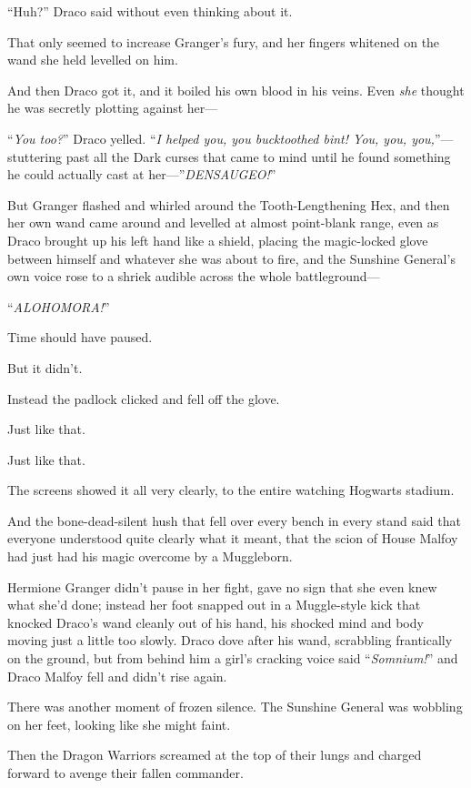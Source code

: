 “Huh?” Draco said without even thinking about it.

That only seemed to increase Granger’s fury, and her fingers whitened on the wand she held levelled on him.

And then Draco got it, and it boiled his own blood in his veins. Even \emph{she} thought he was secretly plotting against her—

“\emph{You too?}” Draco yelled. “\emph{I helped you, you bucktoothed bint! You, you, you,}”— stuttering past all the Dark curses that came to mind until he found something he could actually cast at her—”\emph{DENSAUGEO!}”

But Granger flashed and whirled around the Tooth-Lengthening Hex, and then her own wand came around and levelled at almost point-blank range, even as Draco brought up his left hand like a shield, placing the magic-locked glove between himself and whatever she was about to fire, and the Sunshine General’s own voice rose to a shriek audible across the whole battleground—

“\emph{ALOHOMORA!}”

Time should have paused.

But it didn’t.

Instead the padlock clicked and fell off the glove.

Just like that.

Just like that.

The screens showed it all very clearly, to the entire watching Hogwarts stadium.

And the bone-dead-silent hush that fell over every bench in every stand said that everyone understood quite clearly what it meant, that the scion of House Malfoy had just had his magic overcome by a Muggleborn.

Hermione Granger didn’t pause in her fight, gave no sign that she even knew what she’d done; instead her foot snapped out in a Muggle-style kick that knocked Draco’s wand cleanly out of his hand, his shocked mind and body moving just a little too slowly. Draco dove after his wand, scrabbling frantically on the ground, but from behind him a girl’s cracking voice said “\emph{Somnium!}” and Draco Malfoy fell and didn’t rise again.

There was another moment of frozen silence. The Sunshine General was wobbling on her feet, looking like she might faint.

Then the Dragon Warriors screamed at the top of their lungs and charged forward to avenge their fallen commander.


